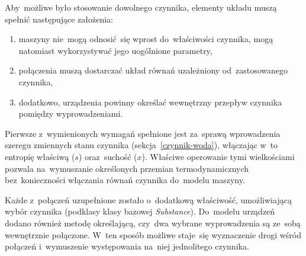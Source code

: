 Aby~możliwe było stosowanie dowolnego czynnika, elementy układu muszą
spełnić następujące założenia:

\begin{enumerate}

	\item maszyny nie~mogą odnosić~się wprost do~właściwości czynnika,
		mogą natomiast wykorzystywać jego uogólnione parametry,

	\item połączenia muszą dostarczać układ równań uzależniony
		od~zastosowanego czynnika,

	\item dodatkowo, urządzenia powinny określać wewnętrzny przepływ
		czynnika pomiędzy wyprowadzeniami.

\end{enumerate}

Pierwsze z~wymienionych wymagań spełnione jest za~sprawą wprowadzenia
szeregu zmiennych stanu czynnika (sekcja~\ref{czynnik-woda}), włączając
w~to entropię właściwą ($s$) oraz~suchość ($x$). Właściwe operowanie
tymi wielkościami pozwala na~wymuszanie określonych przemian
termodynamicznych bez~konieczności włączania równań czynnika do~modelu
maszyny.

Każde z~połączeń uzupełnione zostało o~dodatkową właściwość,
umożliwiającą wybór czynnika (podklasy klasy bazowej
\textit{Substance}). Do~modelu urządzeń dodano również metodę
określającą, czy~dwa wybrane wyprowadzenia są ze~sobą wewnętrznie
połączone. W~ten sposób możliwe staje~się wyznaczenie drogi wśród
połączeń i~wymuszenie występowania na~niej jednolitego czynnika.
